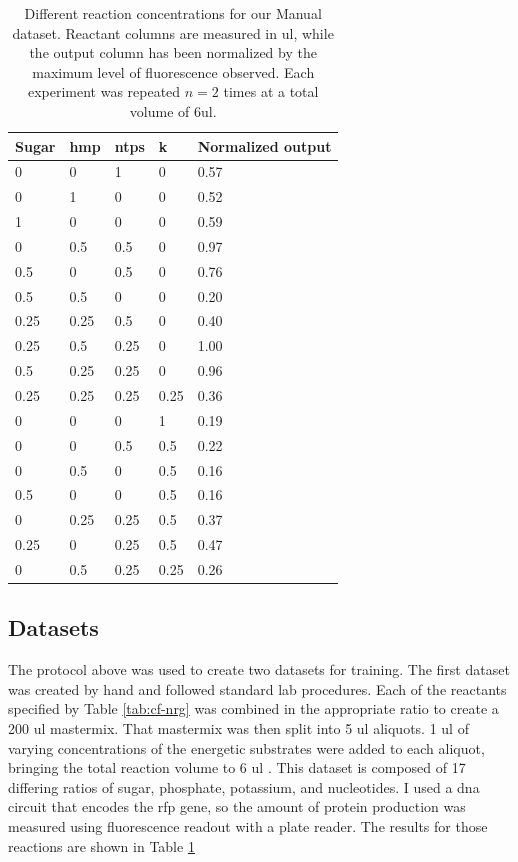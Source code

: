 \begin{table}[]
\centering
\begin{tabular}{llll | l}
Sugar & \gls{hmp} & \Glspl{ntp} & \gls{k} & Normalized output   \\ \hline
0    & 0    & 1    & 0    & 0.57 \\
0    & 1    & 0    & 0    & 0.52 \\
1    & 0    & 0    & 0    & 0.59 \\
0    & 0.5  & 0.5  & 0    & 0.97 \\
0.5  & 0    & 0.5  & 0    & 0.76 \\
0.5  & 0.5  & 0    & 0    & 0.20 \\
0.25 & 0.25 & 0.5  & 0    & 0.40 \\
0.25 & 0.5  & 0.25 & 0    & 1.00 \\
0.5  & 0.25 & 0.25 & 0    & 0.96 \\
0.25 & 0.25 & 0.25 & 0.25 & 0.36 \\
0    & 0    & 0    & 1    & 0.19 \\
0    & 0    & 0.5  & 0.5  & 0.22 \\
0    & 0.5  & 0    & 0.5  & 0.16 \\
0.5  & 0    & 0    & 0.5  & 0.16 \\
0    & 0.25 & 0.25 & 0.5  & 0.37 \\
0.25 & 0    & 0.25 & 0.5  & 0.47 \\
0    & 0.5  & 0.25 & 0.25 & 0.26
\end{tabular}
\caption[Different reaction concentrations for our Manual dataset]{Different reaction concentrations for our Manual dataset.
Reactant columns are measured in \gls{ul}, while the output column has been normalized by the maximum level of fluorescence observed.
Each experiment was repeated $n = 2$ times at a total volume of 6\gls{ul}.
}
\label{tab:manual}
\end{table}

\subsection{Datasets}
The protocol above was used to create two datasets for training.
The first dataset was created by hand and followed standard lab procedures.
Each of the reactants specified by Table \ref{tab:cf-nrg} was combined in the appropriate ratio to create a 200 \gls{ul} mastermix. 
That mastermix was then split into 5 \gls{ul} aliquots.
1 \gls{ul} of varying concentrations of the energetic substrates were added to each aliquot, bringing the total reaction volume to 6 \gls{ul} .
This dataset is composed of 17 differing ratios of sugar, phosphate, potassium, and nucleotides.
I used a \gls{dna} circuit that encodes the \gls{rfp} gene, so the amount of protein production was measured using fluorescence readout with a plate reader.
The results for those reactions are shown in Table \ref{tab:manual}

